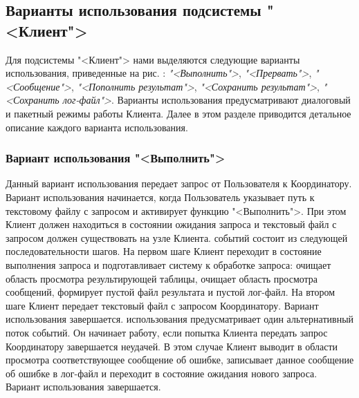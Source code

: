 \documentclass[11pt,oneside]{article}
\begin{document}
	\subsection{Варианты использования подсистемы "<Клиент">}\label{S_ClientUseCase}
	
	
	Для подсистемы "<Клиент"> нами выделяются следующие варианты использования, приведенные на рис. %
	: \textit{"<Выполнить">}, \textit{"<Прервать">}, \textit{"<Сообщение">}, \textit{"<Пополнить результат">}, \textit{"<Сохранить результат">}, \textit{"<Сохранить лог-файл">}. Варианты использования предусматривают диалоговый и пакетный режимы работы Клиента. Далее в этом разделе приводится детальное описание каждого варианта использования.
	
	\subsubsection{Вариант использования "<Выполнить">}
	Данный вариант использования передает запрос от Пользователя к Координатору. Вариант использования начинается, когда Пользователь указывает путь к текстовому файлу с запросом и активирует функцию "<Выполнить">. При этом Клиент должен находиться в состоянии ожидания запроса и текстовый файл с запросом должен существовать на узле Клиента.
	 событий состоит из следующей последовательности шагов. На первом шаге Клиент переходит в состояние выполнения запроса и подготавливает систему к обработке запроса: очищает область просмотра результирующей таблицы, очищает область просмотра сообщений, формирует пустой файл результата и пустой лог-файл. На втором шаге Клиент передает текстовый файл с запросом Координатору. Вариант использования завершается.
	 использования предусматривает один альтернативный поток событий. Он начинает работу, если попытка Клиента передать запрос Координатору завершается неудачей. В этом случае Клиент выводит в области просмотра соответствующее сообщение об ошибке, записывает данное сообщение об ошибке в лог-файл и переходит в состояние ожидания нового запроса. Вариант использования завершается.
	
\end{document}
